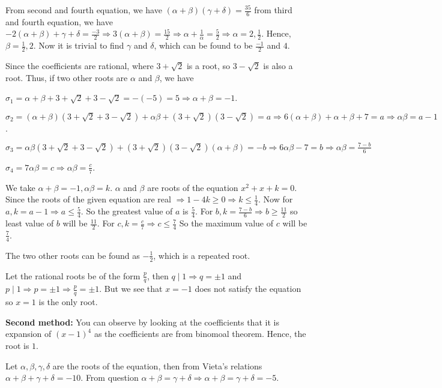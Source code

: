   From second and fourth equation, we have $(\alpha + \beta)(\gamma + \delta) = \frac{35}{6}$ from third and
  fourth equation, we have $-2(\alpha + \beta) + \gamma + \delta = \frac{-3}{2} \Rightarrow 3(\alpha +
  \beta) = \frac{15}{2} \Rightarrow \alpha + \frac{1}{\alpha} = \frac{5}{2}\Rightarrow \alpha = 2,
  \frac{1}{2}$. Hence, $\beta = \frac{1}{2}, 2$. Now it is trivial to find $\gamma$ and $\delta$, which can
  be found to be $\frac{-1}{2}$ and $4$.
\item Since the coefficients are rational, where $3 + \sqrt{2}$ is a root, so $3 - \sqrt{2}$ is also a
  root. Thus, if two other roots are $\alpha$ and $\beta$, we  have

  $\sigma_1 = \alpha + \beta + 3 + \sqrt{2} + 3 - \sqrt{2} = -(-5) = 5 \Rightarrow \alpha + \beta = -1$.

  $\sigma_2 = (\alpha + \beta)(3 + \sqrt{2} + 3 - \sqrt{2}) + \alpha\beta + (3 + \sqrt{2})(3 - \sqrt{2}) = a
  \Rightarrow 6(\alpha + \beta) + \alpha + \beta + 7 = a \Rightarrow \alpha\beta = a - 1$.

  $\sigma_3 = \alpha\beta(3 + \sqrt{2} + 3 - \sqrt{2}) + (3 + \sqrt{2})(3 - \sqrt{2})(\alpha + \beta) = -b
  \Rightarrow 6\alpha\beta - 7 = b\Rightarrow \alpha\beta = \frac{7 - b}{6}$

  $\sigma_4 = 7\alpha\beta = c \Rightarrow \alpha\beta = \frac{c}{7}$.

  We take $\alpha + \beta = -1, \alpha\beta = k$. $\alpha$ and $\beta$ are roots of the equation $x^2 + x +
  k= 0$. Since the roots of the given equation are real $\Rightarrow 1 - 4k\geq 0 \Rightarrow k\leq
  \frac{1}{4}$. Now for $a, k = a - 1\Rightarrow a\leq \frac{5}{4}$. So the greatest value of $a$ is
  $\frac{5}{4}$. For $b, k = \frac{7 - b}{6} \Rightarrow b\geq \frac{11}{2}$ so least value of $b$ will be
  $\frac{11}{2}$. For $c, k = \frac{c}{7} \Rightarrow c\leq \frac{7}{4}$ So the maximum value of $c$ will be
  $\frac{7}{4}$.

  The two other roots can be found as $-\frac{1}{2}$, which is a repeated root.
\item Let the rational roots be of the form $\frac{p}{q}$, then $q\mid 1 \Rightarrow q = \pm 1$ and $p\mid
  1\Rightarrow p = \pm 1 \Rightarrow \frac{p}{q} = \pm 1$. But we see that $x = -1$ does not satisfy the
  equation so $x = 1$ is the only root.

  {\bf Second method:} You can observe by looking at the coefficients that it is expansion of $(x - 1)^4$ as
  the coefficients are from binomoal theorem. Hence, the root is $1.$
\item Let $\alpha, \beta, \gamma, \delta$ are the roots of the equation, then from Vieta's relations $\alpha +
  \beta + \gamma + \delta = -10$. From question $\alpha + \beta = \gamma +
\delta \Rightarrow \alpha + \beta =
  \gamma + \delta = -5$.


